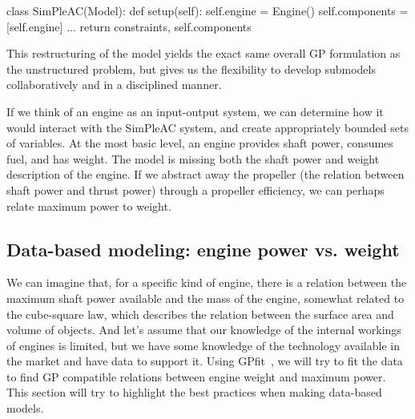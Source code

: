 \begin{python}
    class SimPleAC(Model):
        def setup(self):
            self.engine = Engine()
            self.components = [self.engine]
            ...
            return constraints, self.components
\end{python}

This restructuring of the model yields the exact same overall \gls{GP} formulation
as the unstructured problem, but gives us the flexibility to develop submodels
collaboratively and in a disciplined manner.

If we think of an engine as an input-output system, we can determine how it
would interact with the SimPleAC system, and create appropriately bounded
sets of variables.
At the most basic level, an engine provides shaft power, consumes fuel,
and has weight. The model is missing both the shaft power and weight description
of the engine. If we abstract away the propeller (the relation between shaft
power and thrust power) through a propeller efficiency,
we can perhaps relate maximum power to weight.

\subsection{Data-based modeling: engine power vs. weight}
\label{s:datafit}

We can imagine that, for a specific kind of engine, there is a relation between the
maximum shaft power available and the mass of the engine, somewhat related to the
cube-square law, which describes the relation between the surface area and volume
of objects. And let's assume that our knowledge of the internal workings of engines
is limited, but we have some knowledge of the technology available in the market
and have data to support it. Using GPfit~\cite{gpfitpaper}, we will try to fit the data to find
\gls{GP} compatible relations between engine weight and maximum power. This section
will try to highlight the best practices when making data-based models.

